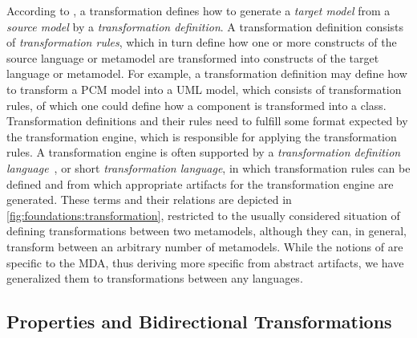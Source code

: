 According to \textcite{kleppe2003mdaExplained-Book}, a transformation defines how to generate a \emph{target model} from a \emph{source model} by a \emph{transformation definition}.
A transformation definition consists of \emph{transformation rules}, which in turn define how one or more constructs of the source language or metamodel are transformed into constructs of the target language or metamodel.
For example, a transformation definition may define how to transform a \gls{PCM} model into a \gls{UML} model, which consists of transformation rules, of which one could define how a component is transformed into a class.
Transformation definitions and their rules need to fulfill some format expected by the transformation engine, which is responsible for applying the transformation rules.
A transformation engine is often supported by a \emph{transformation definition language}~\cite[Sec.~9.2]{kleppe2003mdaExplained-Book}, or short \emph{transformation language}, in which transformation rules can be defined and from which appropriate artifacts for the transformation engine are generated.
These terms and their relations are depicted in \autoref{fig:foundations:transformation}, restricted to the usually considered situation of defining transformations between two metamodels, although they can, in general, transform between an arbitrary number of metamodels.
While the notions of \textcite{kleppe2003mdaExplained-Book} are specific to the \gls{MDA}, thus deriving more specific from abstract artifacts, we have generalized them to transformations between any languages.


\subsection{Properties and Bidirectional Transformations}
\label{chap:foundations:transformations:properties}

